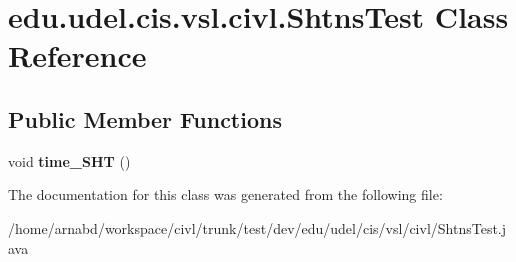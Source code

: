 \hypertarget{classedu_1_1udel_1_1cis_1_1vsl_1_1civl_1_1ShtnsTest}{}\section{edu.\+udel.\+cis.\+vsl.\+civl.\+Shtns\+Test Class Reference}
\label{classedu_1_1udel_1_1cis_1_1vsl_1_1civl_1_1ShtnsTest}
\subsection*{Public Member Functions}
\begin{DoxyCompactItemize}
\item 
\hypertarget{classedu_1_1udel_1_1cis_1_1vsl_1_1civl_1_1ShtnsTest_a6c2f358e600e6fa5b8847d23d904dfcd}{}void {\bfseries time\+\_\+\+S\+H\+T} ()\label{classedu_1_1udel_1_1cis_1_1vsl_1_1civl_1_1ShtnsTest_a6c2f358e600e6fa5b8847d23d904dfcd}

\end{DoxyCompactItemize}


The documentation for this class was generated from the following file\+:\begin{DoxyCompactItemize}
\item 
/home/arnabd/workspace/civl/trunk/test/dev/edu/udel/cis/vsl/civl/Shtns\+Test.\+java\end{DoxyCompactItemize}
